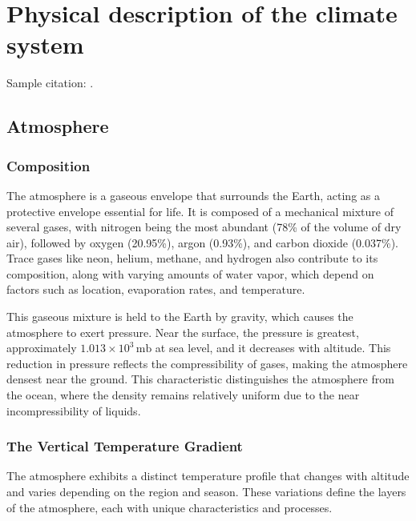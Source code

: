 \chapter{Physical description of the climate system}

Sample citation: \citet{Richardson1922}.

\section{Atmosphere}
\subsection*{Composition}

The atmosphere is a gaseous envelope that surrounds the Earth, acting as a protective envelope essential for life. It is composed of a mechanical mixture of several gases, with nitrogen being the most abundant (78\% of the volume of dry air), followed by oxygen (20.95\%), argon (0.93\%), and carbon dioxide (0.037\%). Trace gases like neon, helium, methane, and hydrogen also contribute to its composition, along with varying amounts of water vapor, which depend on factors such as location, evaporation rates, and temperature.

This gaseous mixture is held to the Earth by gravity, which causes the atmosphere to exert pressure. Near the surface, the pressure is greatest, approximately $1.013 \times 10^3 \, \mathrm{mb}$ at sea level, and it decreases with altitude. This reduction in pressure reflects the compressibility of gases, making the atmosphere densest near the ground. This characteristic distinguishes the atmosphere from the ocean, where the density remains relatively uniform due to the near incompressibility of liquids.

\subsection*{The Vertical Temperature Gradient}

The atmosphere exhibits a distinct temperature profile that changes with altitude and varies depending on the region and season. These variations define the layers of the atmosphere, each with unique characteristics and processes.


